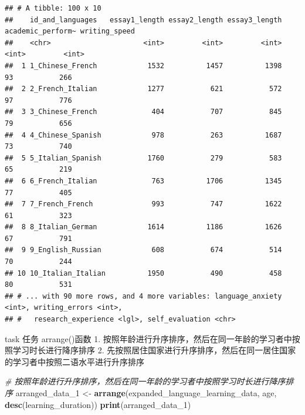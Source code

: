 \documentclass[]{book}
\newenvironment{Shaded}{\begin{snugshade}}{\end{snugshade}}
\newcommand{\CommentTok}[1]{\textcolor[rgb]{0.56,0.35,0.01}{\textit{#1}}}
\newcommand{\DecValTok}[1]{\textcolor[rgb]{0.00,0.00,0.81}{#1}}
\newcommand{\KeywordTok}[1]{\textcolor[rgb]{0.13,0.29,0.53}{\textbf{#1}}}
\newcommand{\NormalTok}[1]{#1}
\newcommand{\StringTok}[1]{\textcolor[rgb]{0.31,0.60,0.02}{#1}}
\begin{document}
\begin{verbatim}
## # A tibble: 100 x 10
##    id_and_languages   essay1_length essay2_length essay3_length academic_perform~ writing_speed
##    <chr>                      <int>         <int>         <int>             <int>         <int>
##  1 1_Chinese_French            1532          1457          1398                93           266
##  2 2_French_Italian            1277           621           572                97           776
##  3 3_Chinese_French             404           707           845                79           656
##  4 4_Chinese_Spanish            978           263          1687                73           740
##  5 5_Italian_Spanish           1760           279           583                65           219
##  6 6_French_Italian             763          1706          1345                77           405
##  7 7_French_French              993           747          1622                61           323
##  8 8_Italian_German            1614          1186          1626                67           791
##  9 9_English_Russian            608           674           514                70           244
## 10 10_Italian_Italian          1950           490           458                80           531
## # ... with 90 more rows, and 4 more variables: language_anxiety <int>, writing_errors <int>,
## #   research_experience <lgl>, self_evaluation <chr>
\end{verbatim}

\begin{infobox}task
任务
arrange()函数
1. 按照年龄进行升序排序，然后在同一年龄的学习者中按照学习时长进行降序排序
2. 先按照居住国家进行升序排序，然后在同一居住国家的学习者中按照二语水平进行升序排序

\end{infobox}

\begin{Shaded}
\begin{Highlighting}[]
\CommentTok{# 按照年龄进行升序排序，然后在同一年龄的学习者中按照学习时长进行降序排序}
\NormalTok{arranged_data_}\DecValTok{1}\NormalTok{ <-}\StringTok{ }\KeywordTok{arrange}\NormalTok{(expanded_language_learning_data, age, }\KeywordTok{desc}\NormalTok{(learning_duration))}
\KeywordTok{print}\NormalTok{(arranged_data_}\DecValTok{1}\NormalTok{)}
\end{Highlighting}
\end{Shaded}
\end{document}

